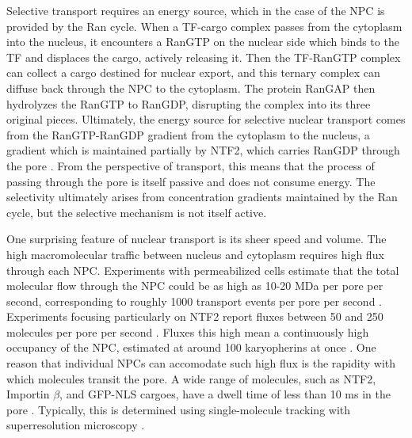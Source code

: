 Selective transport requires an energy source, which in the case of the NPC is provided by the Ran cycle.  When a TF-cargo complex passes from the cytoplasm into the nucleus, it encounters a RanGTP on the nuclear side which binds to the TF and displaces the cargo, actively releasing it.  Then the TF-RanGTP complex can collect a cargo destined for nuclear export, and this ternary complex can diffuse back through the NPC to the cytoplasm.  The protein RanGAP then hydrolyzes the RanGTP to RanGDP, disrupting the complex into its three original pieces.  Ultimately, the energy source for selective nuclear transport comes from the RanGTP-RanGDP gradient from the cytoplasm to the nucleus, a gradient which is maintained partially by NTF2, which carries RanGDP through the pore \cite{jovanovic-talisman17,stanley17}.  From the perspective of transport, this means that the process of passing through the pore is itself passive and does not consume energy.  The selectivity ultimately arises from concentration gradients maintained by the Ran cycle, but the selective mechanism is not itself active.

One surprising feature of nuclear transport is its sheer speed and volume.  The high macromolecular traffic between nucleus and cytoplasm requires high flux through each NPC.  Experiments with permeabilized cells estimate that the total molecular flow through the NPC could be as high as 10-20 MDa per pore per second, corresponding to roughly 1000 transport events per pore per second \cite{ribbeck01}.  Experiments focusing particularly on NTF2 report fluxes between 50 and 250 molecules per pore per second \cite{ribbeck01, siebrasse02, kiskin03}.  Fluxes this high mean a continuously high occupancy of the NPC, estimated at around 100 karyopherins at once \cite{paradise07}. One reason that individual NPCs can accomodate such high flux is the rapidity with which molecules transit the pore.  A wide range of molecules, such as NTF2, Importin $\beta$, and GFP-NLS cargoes, have a dwell time of less than 10 ms in the pore \cite{tu11, yang06, dange08, kubitscheck05}.  Typically, this is determined using single-molecule tracking with superresolution microscopy \cite{tu11}.


